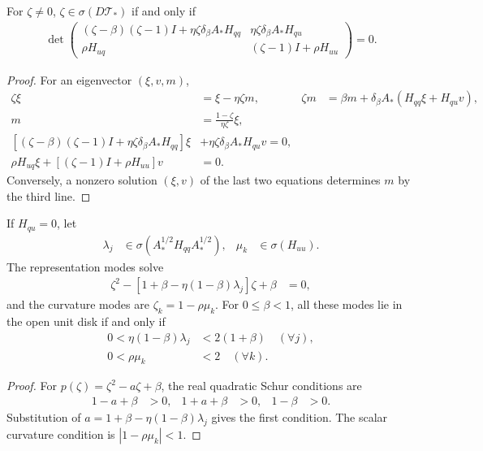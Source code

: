 \begin{proposition}
For $\zeta\ne0$, $\zeta\in\sigma(D\mathcal T_*)$ if and only if
\begin{align}
 \det\begin{pmatrix}
 (\zeta-\beta)(\zeta-1)I+\eta\zeta\delta_\beta A_*H_{qq}&
 \eta\zeta\delta_\beta A_*H_{qu}\\
 \rho H_{uq}&(\zeta-1)I+\rho H_{uu}
 \end{pmatrix}=0.
\end{align}
\end{proposition}
\begin{proof}
For an eigenvector $(\xi,v,m)$,
\begin{align}
 \zeta\xi&=\xi-\eta\zeta m,&
 \zeta m&=\beta m+\delta_\beta A_*(H_{qq}\xi+H_{qu}v),\\
 m&=\frac{1-\zeta}{\eta\zeta}\xi,\\
 [(\zeta-\beta)(\zeta-1)I+\eta\zeta\delta_\beta A_*H_{qq}]\xi
 &+\eta\zeta\delta_\beta A_*H_{qu}v=0,\\
 \rho H_{uq}\xi+[(\zeta-1)I+\rho H_{uu}]v&=0.
\end{align}
Conversely, a nonzero solution $(\xi,v)$ of the last two equations determines $m$ by the third line.
\end{proof}

\begin{corollary}
\label{cor:rigid-modal-stability}
If $H_{qu}=0$, let
\begin{align}
 \lambda_j&\in\sigma(A_*^{1/2}H_{qq}A_*^{1/2}),&
 \mu_k&\in\sigma(H_{uu}).
\end{align}
The representation modes solve
\begin{align}
 \zeta^2-[1+\beta-\eta(1-\beta)\lambda_j]\zeta+\beta&=0,
\end{align}
and the curvature modes are $\zeta_k=1-\rho\mu_k$.
For $0\le\beta<1$, all these modes lie in the open unit disk if and only if
\begin{align}
 0<\eta(1-\beta)\lambda_j&<2(1+\beta)\quad(\forall j),\\
 0<\rho\mu_k&<2\quad(\forall k).
\end{align}
\end{corollary}
\begin{proof}
For $p(\zeta)=\zeta^2-a\zeta+\beta$, the real quadratic Schur conditions are
\begin{align}
 1-a+\beta&>0,&1+a+\beta&>0,&1-\beta&>0.
\end{align}
Substitution of $a=1+\beta-\eta(1-\beta)\lambda_j$ gives the first condition. The scalar curvature condition is $|1-\rho\mu_k|<1$.
\end{proof}

